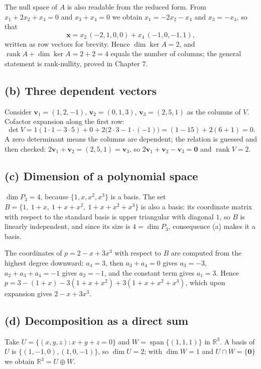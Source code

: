 The null space of $A$ is also readable from the reduced form. From $x_{1}+2x_{2}+x_{4}=0$ and
$x_{3}+x_{4}=0$ we obtain $x_{1}=-2x_{2}-x_{4}$ and $x_{3}=-x_{4}$, so that
\[
  \mathbf{x}=x_{2}\,(-2,1,0,0)+x_{4}\,(-1,0,-1,1),
\]
written as row vectors for brevity. Hence $\dim\ker A=2$, and
$\operatorname{rank}A+\dim\ker A=2+2=4$ equals the number of columns; the general statement is
rank-nullity, proved in Chapter 7.

\subsection*{(b) Three dependent vectors}

Consider $\mathbf{v}_{1}=(1,2,-1)$, $\mathbf{v}_{2}=(0,1,3)$, $\mathbf{v}_{3}=(2,5,1)$ as
the columns of $V$. Cofactor expansion along the first row:
\[
  \det V=1(1\cdot1-3\cdot5)+0+2\bigl(2\cdot3-1\cdot(-1)\bigr)=(1-15)+2(6+1)=0.
\]
A zero determinant means the columns are dependent; the relation is guessed and then checked:
$2\mathbf{v}_{1}+\mathbf{v}_{2}=(2,5,1)=\mathbf{v}_{3}$, so
$2\mathbf{v}_{1}+\mathbf{v}_{2}-\mathbf{v}_{3}=\mathbf{0}$ and $\operatorname{rank}V=2$.

\subsection*{(c) Dimension of a polynomial space}

$\dim P_{3}=4$, because $\{1,x,x^{2},x^{3}\}$ is a basis. The set
$B=\{1,\ 1+x,\ 1+x+x^{2},\ 1+x+x^{2}+x^{3}\}$ is also a basis: its coordinate matrix with respect
to the standard basis is upper triangular with diagonal $1$, so $B$ is linearly independent, and
since its size is $4=\dim P_{3}$, consequence (a) makes it a basis.

The coordinates of $p=2-x+3x^{3}$ with respect to $B$ are computed from the highest degree
downward: $a_{4}=3$, then $a_{3}+a_{4}=0$ gives $a_{3}=-3$, $a_{2}+a_{3}+a_{4}=-1$ gives
$a_{2}=-1$, and the constant term gives $a_{1}=3$. Hence
$p=3-(1+x)-3(1+x+x^{2})+3(1+x+x^{2}+x^{3})$, which upon expansion gives $2-x+3x^{3}$.

\subsection*{(d) Decomposition as a direct sum}

Take $U=\{(x,y,z):x+y+z=0\}$ and $W=\operatorname{span}\{(1,1,1)\}$ in $\mathbb{R}^{3}$.
A basis of $U$ is $\{(1,-1,0),(1,0,-1)\}$, so $\dim U=2$; with $\dim W=1$ and
$U\cap W=\{\mathbf{0}\}$ we obtain $\mathbb{R}^{3}=U\oplus W$.

